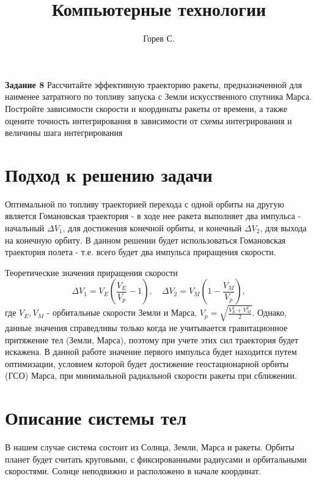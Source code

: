 



\title{Компьютерные технологии}
\author{Горев С.}




\maketitle

\textbf{Задание 8} Рассчитайте эффективную траекторию ракеты, предназначенной для наименее
затратного по топливу запуска с Земли искусственного спутника Марса. Постройте зависимости
скорости и координаты ракеты от времени, а также оцените точность интегрирования в
зависимости от схемы интегрирования и величины шага интегрирования

\section{Подход к решению задачи}
Оптимальной по топливу траекторией перехода с одной орбиты на другую является
Гомановская траектория - в ходе нее ракета выполняет два импульса - начальный $\Delta V_1$,
для достижения конечной орбиты, и конечный $\Delta V_2$, для выхода на конечную орбиту.
В данном решении будет использоваться Гомановская траектория полета - т.е. всего будет два импульса приращения скорости.

Теоретические значения приращения скорости
\begin{equation}
	\Delta V_1 = V_E \left(\frac{V_E}{V_p}-1\right), \quad \Delta V_2 = V_M \left(1- \frac{V_M}{V_p}\right),
\end{equation}
где $V_E, V_M$ - орбитальные скорости Земли и Марса, $V_p = \sqrt{\frac{V_E^2 + V_M^2}{2}}$. Однако, данные значения справедливы
только когда не учитывается гравитационное притяжение тел (Земли, Марса), поэтому при учете этих сил
траектория будет искажена. В данной работе значение первого импульса будет находится путем оптимизации, условием которой будет
достижение геостационарной орбиты (ГСО) Марса, при минимальной радиальной скорости ракеты при сближении.

\section{Описание системы тел}
В нашем случае система состоит из Солнца, Земли, Марса и ракеты. Орбиты планет будет считать круговыми, с фиксированными
радиусами и орбитальными скоростями. Солнце неподвижно и расположено в начале координат.

